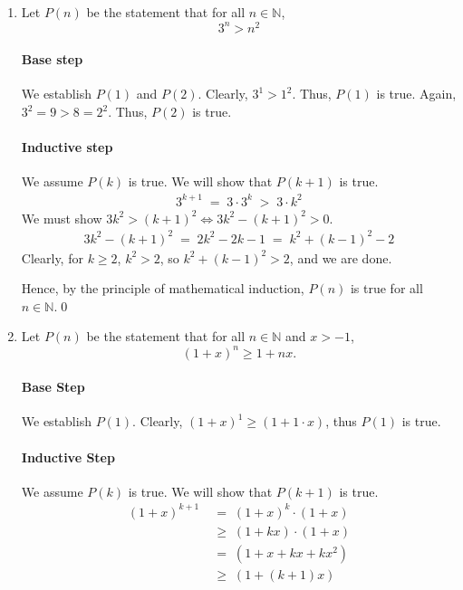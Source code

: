 \documentclass[10pt]{article}
\begin{document}
        \begin{enumerate}
                \item Let $P(n)$ be the statement that for all $n \in \mathbb{N}$,
                \[3^n > n^2\]
                \paragraph{Base step}
                We establish $P(1)$ and $P(2)$. Clearly, $3^1 > 1^2$. Thus, $P(1)$ is true.
                Again, $3^2 = 9 > 8 = 2^2$. Thus, $P(2)$ is true.
                \paragraph{Inductive step}
                We assume $P(k)$ is true. We will show that $P(k + 1)$ is true.
                \begin{align*}
                        3^{k + 1} \;=\; 3\cdot 3^k
                                \;>\; 3\cdot k^2
                \end{align*}
                We must show $3k^2 > (k + 1)^2 \Leftrightarrow 3k^2 - (k + 1)^2 > 0$.
                \begin{align*}
                        3k^2 - (k + 1)^2 \;=\; 2k^2 - 2k - 1
                                \;=\; k^2 + (k - 1)^2  - 2
                \end{align*}
                Clearly, for $k \geq 2$, $k^2 > 2$, so $k^2 + (k - 1)^2 > 2$, and we are done.

                Hence, by the principle of mathematical induction, $P(n)$ is true for all $n \in \mathbb{N}$.\qed\\

                \item Let $P(n)$ be the statement that for all $n \in \mathbb{N}$ and $x > -1$,
                \[(1 + x)^n \geq 1 + nx. \tag{Bernoulli's Inequality}\]
                \paragraph{Base Step}
                We establish $P(1)$. 
                Clearly, $(1 + x)^1 \geq (1 + 1\cdot x)$, thus $P(1)$ is true.
                \paragraph{Inductive Step}
                We assume $P(k)$ is true. We will show that $P(k + 1)$ is true.
                \begin{align*}
                        (1 + x)^{k + 1} \;&=\; (1 + x)^k\cdot (1 + x) \\
                                \;&\geq\; (1 + kx)\cdot (1 + x) \tag{$x + 1 > 0$}\\
                                \;&=\; (1 + x + kx + kx^2)\\
                                \;&\geq\; (1 + (k + 1)x) \tag{$k > 0$ and $x^2 \geq 0$}
                \end{align*}
                

\end{enumerate}
\end{document}

